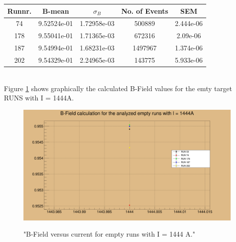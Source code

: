 \documentclass[12pt, letterpaper]{article}
\begin{document}
\begin{tabular}{|c|c|c|c|c|}
\hline
Runnr. & B-mean & $\sigma_{B}$ & No. of Events & SEM\\
\hline
74		&	9.52524e-01 	&	1.72958e-03	&  500889 &	2.444e-06 \\
178		&	9.55041e-01		&	1.71365e-03	&  672316 & 2.09e-06 \\
187 	&	9.54994e-01		&	1.68231e-03	&  1497967  & 1.374e-06 \\
202		&	9.54329e-01		&	2.24965e-03	&  143775 	& 5.933e-06 \\


\hline

\end{tabular}
\newline
\\
Figure \ref{compare_empty} shows graphically the calculated B-Field values for the emty target RUNS with I = 1444A.
\begin{figure}[!htbp]
	\centering
	\includegraphics[width=.9\linewidth]{b_field_I_1444.png}
	\label{compare_empty}
	\caption{"B-Field versus current for empty runs with I = 1444 A."}
\end{figure}
\end{document}
